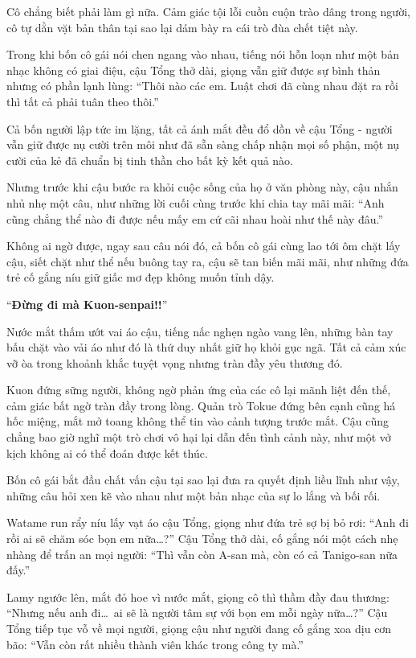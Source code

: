 \documentclass[../main.tex]{subfiles}
\begin{document}
Cô chẳng biết phải làm gì nữa. Cảm giác tội lỗi cuồn cuộn trào dâng trong người, cô tự dằn vặt bản thân tại sao lại dám bày ra cái trò đùa chết tiệt này.

Trong khi bốn cô gái nói chen ngang vào nhau, tiếng nói hỗn loạn như một bản nhạc không có giai điệu, cậu Tổng thở dài, giọng vẫn giữ được sự bình thản nhưng có phần lạnh lùng: ``Thôi nào các em. Luật chơi đã cùng nhau đặt ra rồi thì tất cả phải tuân theo thôi.''

Cả bốn người lập tức im lặng, tất cả ánh mắt đều đổ dồn về cậu Tổng - người vẫn giữ được nụ cười trên môi như đã sẵn sàng chấp nhận mọi số phận, một nụ cười của kẻ đã chuẩn bị tinh thần cho bất kỳ kết quả nào.

Nhưng trước khi cậu bước ra khỏi cuộc sống của họ ở văn phòng này, cậu nhắn nhủ nhẹ một câu, như những lời cuối cùng trước khi chia tay mãi mãi: ``Anh cũng chẳng thể nào đi được nếu mấy em cứ cãi nhau hoài như thế này đâu.''

Không ai ngờ được, ngay sau câu nói đó, cả bốn cô gái cùng lao tới ôm chặt lấy cậu, siết chặt như thể nếu buông tay ra, cậu sẽ tan biến mãi mãi, như những đứa trẻ cố gắng níu giữ giấc mơ đẹp không muốn tỉnh dậy.

``\textbf{Đừng đi mà Kuon-senpai!!}''

Nước mắt thấm ướt vai áo cậu, tiếng nấc nghẹn ngào vang lên, những bàn tay bấu chặt vào vải áo như đó là thứ duy nhất giữ họ khỏi gục ngã. Tất cả cảm xúc vỡ òa trong khoảnh khắc tuyệt vọng nhưng tràn đầy yêu thương đó.

Kuon đứng sững người, không ngờ phản ứng của các cô lại mãnh liệt đến thế, cảm giác bất ngờ tràn đầy trong lòng. Quản trò Tokue đứng bên cạnh cũng há hốc miệng, mắt mở toang không thể tin vào cảnh tượng trước mắt. Cậu cũng chẳng bao giờ nghĩ một trò chơi vô hại lại dẫn đến tình cảnh này, như một vở kịch không ai có thể đoán được kết thúc.

Bốn cô gái bắt đầu chất vấn cậu tại sao lại đưa ra quyết định liều lĩnh như vậy, những câu hỏi xen kẽ vào nhau như một bản nhạc của sự lo lắng và bối rối.

Watame run rẩy níu lấy vạt áo cậu Tổng, giọng như đứa trẻ sợ bị bỏ rơi: ``Anh đi rồi ai sẽ chăm sóc bọn em nữa\dots?'' Cậu Tổng thở dài, cố gắng nói một cách nhẹ nhàng để trấn an mọi người: ``Thì vẫn còn A-san mà, còn có cả Tanigo-san nữa đấy.''

Lamy ngước lên, mắt đỏ hoe vì nước mắt, giọng cô thì thầm đầy đau thương: ``Nhưng nếu anh đi\dots\ ai sẽ là người tâm sự với bọn em mỗi ngày nữa\dots?'' Cậu Tổng tiếp tục vỗ về mọi người, giọng cậu như người đang cố gắng xoa dịu cơn bão: ``Vẫn còn rất nhiều thành viên khác trong công ty mà.''
\end{document}
